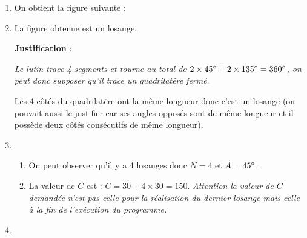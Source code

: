 \begin{enumerate}
	\item On obtient la figure suivante : 
	
	
	
	
	\item La figure obtenue est un losange.
	
	\bigskip
	\textbf{Justification} : 

    \textit{Le lutin trace 4 segments et tourne au total de $2\times45^{\circ}+2\times135\degree=360\degree$, on peut donc supposer qu'il trace un quadrilatère fermé}.
    
    \bigskip
    Les 4 côtés du quadrilatère ont la même longueur donc c'est un losange (on pouvait aussi le justifier car ses angles opposés sont de même longueur et il possède deux côtés consécutifs de même longueur).
    
    \item
    \begin{enumerate}
	    \item On peut observer qu'il y a 4 losanges donc $N=4$ et $A=45\degree$.

	    \item La valeur de $C$ est : $C = 30 + 4 \times 30 = 150$.
	    \textit{Attention la valeur de $C$ demandée n'est pas celle pour la réalisation du dernier losange mais celle à la fin de l'exécution du programme.}
	\end{enumerate}	
	
	\item
	
	\begin{scratch}
	
		{
		}	
	\end{scratch}

\end{enumerate}